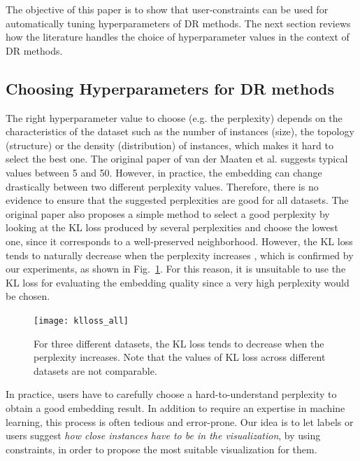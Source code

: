 The objective of this paper is to show that user-constraints can be used for automatically tuning hyperparameters of DR methods. The next section reviews how the literature handles the choice of hyperparameter values in the context of DR methods.

\subsection{Choosing Hyperparameters for DR methods}\label{subsec:tune_HP}

The right hyperparameter value to choose (e.g. the perplexity) depends on the characteristics of the dataset such as the number of instances (size), the topology (structure) or the density (distribution) of instances, which makes it hard to select the best one.
The original paper of van der Maaten et al. \cite{maaten2008tsne} suggests typical values between 5 and 50.
However, in practice, the embedding can change drastically between two different perplexity values. Therefore, there is no evidence to ensure that the suggested perplexities are good for all datasets.
The original paper also proposes a simple method to select a good perplexity by looking at the KL loss produced by several perplexities and choose the lowest one, since it corresponds to a well-preserved neighborhood.
However, the KL loss tends to naturally decrease when the perplexity increases \cite{cao2017automatic}, which  is confirmed by our experiments, as shown in Fig.~\ref{fig:klloss}. For this reason, it is unsuitable to use the KL loss for evaluating the embedding quality since a very high perplexity would be chosen.

\begin{figure}
    \centering
    \texttt{[image: klloss\_all]}
    \caption{For three different datasets, the KL loss tends to decrease when the perplexity increases. Note that the values of KL loss across different datasets are not comparable.}
    \label{fig:klloss}
\end{figure}

In practice, users have to carefully choose a hard-to-understand perplexity to obtain a good embedding result.
In addition to require an expertise in machine learning, this process is often tedious and error-prone.
Our idea is to let labels or users suggest \emph{how close instances have to be in the visualization}, by using constraints, in order to propose the most suitable visualization for them.


